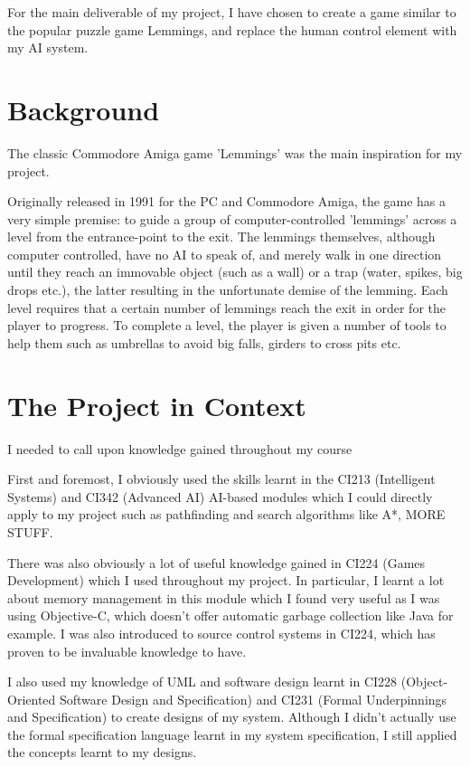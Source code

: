 \documentclass[a4paper,oneside]{report}
\begin{document}
For the main deliverable of my project, I have chosen to create a game similar to the popular puzzle game Lemmings, and replace the human control element with my AI system.

\section{Background}

The classic Commodore Amiga game 'Lemmings' was the main inspiration for my project.

Originally released in 1991 for the PC and Commodore Amiga, the game has a very simple premise: to guide a group of computer-controlled ’lemmings’ across a level from the entrance-point to the exit. The lemmings themselves, although computer controlled, have no AI to speak of, and merely walk in one direction until they reach an immovable object (such as a wall) or a trap (water, spikes, big drops etc.), the latter resulting in the unfortunate demise of the lemming. Each level requires that a certain number of lemmings reach the exit in order for the player to progress. To complete a level, the player is given a number of tools to help them such as umbrellas to avoid big falls, girders to cross pits etc.
		
\section{The Project in Context}
	
I needed to call upon knowledge gained throughout my course 

First and foremost, I obviously used the skills learnt in the CI213 (Intelligent Systems) and CI342 (Advanced AI) AI-based modules which I could directly apply to my project such as pathfinding and search algorithms like A*, MORE STUFF. 

There was also obviously a lot of useful knowledge gained in CI224 (Games Development) which I used throughout my project. In particular, I learnt a lot about memory management in this module which I found very useful as I was using Objective-C, which doesn't offer automatic garbage collection like Java for example. I was also introduced to source control systems in CI224, which has proven to be invaluable knowledge to have.

I also used my knowledge of UML and software design learnt in CI228 (Object-Oriented Software Design and Specification) and CI231 (Formal Underpinnings and Specification) to create designs of my system. Although I didn't actually use the formal specification language learnt in my system specification, I still applied the concepts learnt to my designs.
\end{document}
